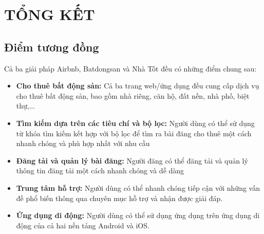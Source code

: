 \section{TỔNG KẾT}
\subsection{Điểm tương đồng}
Cả ba giải pháp Airbnb, Batdongsan và Nhà Tốt đều có những điểm chung sau:
\begin{itemize}
    \item \textbf{Cho thuê bất động sản:} Cả ba trang web/ứng dụng đều cung cấp dịch vụ cho thuê bất động sản, bao gồm nhà riêng, căn hộ, đất nền, nhà phố, biệt thự,...
    \item \textbf{Tìm kiếm dựa trên các tiêu chí và bộ lọc:} Người dùng có thể sử dụng từ khóa tìm kiếm kết hợp với bộ lọc để tìm ra bài đăng cho thuê một cách nhanh chóng và phù hợp nhất với nhu cầu
    \item \textbf{Đăng tải và quản lý bài đăng:} Người đăng có thể đăng tải và quản lý thông tin đăng tải một cách nhanh chóng và dễ dàng
    \item \textbf{Trung tâm hỗ trợ:} Người dùng có thể nhanh chóng tiếp cận với những vấn đề phổ biến thông qua chuyên mục hỗ trợ và nhận được giải đáp.
    \item \textbf{Ứng dụng di động:} Người dùng có thể sử dụng ứng dụng trên ứng dụng di động của cả hai nền tảng Android và iOS.
\end{itemize}
